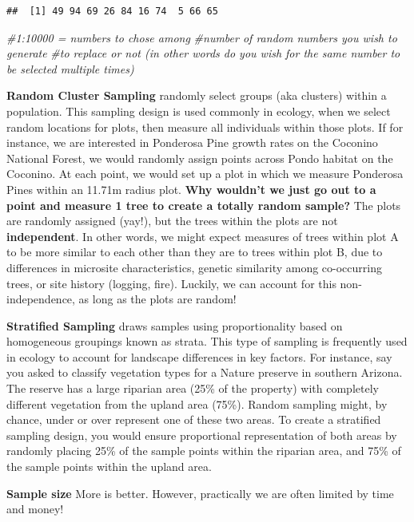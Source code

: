 \documentclass[
]{book}
\newenvironment{Shaded}{\begin{snugshade}}{\end{snugshade}}
\newcommand{\CommentTok}[1]{\textcolor[rgb]{0.56,0.35,0.01}{\textit{#1}}}
\begin{document}
\begin{verbatim}
##  [1] 49 94 69 26 84 16 74  5 66 65
\end{verbatim}

\begin{Shaded}
\begin{Highlighting}[]
\CommentTok{\#1:10000 = numbers to chose among }
\CommentTok{\#number of random numbers you wish to generate}
\CommentTok{\#to replace or not (in other words do you wish for the same number to be selected multiple times)}
\end{Highlighting}
\end{Shaded}

\textbf{Random Cluster Sampling} randomly select groups (aka clusters) within a population. This sampling design is used commonly in ecology, when we select random locations for plots, then measure all individuals within those plots. If for instance, we are interested in Ponderosa Pine growth rates on the Coconino National Forest, we would randomly assign points across Pondo habitat on the Coconino. At each point, we would set up a plot in which we measure Ponderosa Pines within an 11.71m radius plot. \textbf{Why wouldn't we just go out to a point and measure 1 tree to create a totally random sample?} The plots are randomly assigned (yay!), but the trees within the plots are not \textbf{independent}. In other words, we might expect measures of trees within plot A to be more similar to each other than they are to trees within plot B, due to differences in microsite characteristics, genetic similarity among co-occurring trees, or site history (logging, fire). Luckily, we can account for this non-independence, as long as the plots are random!

\textbf{Stratified Sampling} draws samples using proportionality based on homogeneous groupings known as strata. This type of sampling is frequently used in ecology to account for landscape differences in key factors. For instance, say you asked to classify vegetation types for a Nature preserve in southern Arizona. The reserve has a large riparian area (25\% of the property) with completely different vegetation from the upland area (75\%). Random sampling might, by chance, under or over represent one of these two areas. To create a stratified sampling design, you would ensure proportional representation of both areas by randomly placing 25\% of the sample points within the riparian area, and 75\% of the sample points within the upland area.

\textbf{Sample size} More is better. However, practically we are often limited by time and money!
\end{document}
